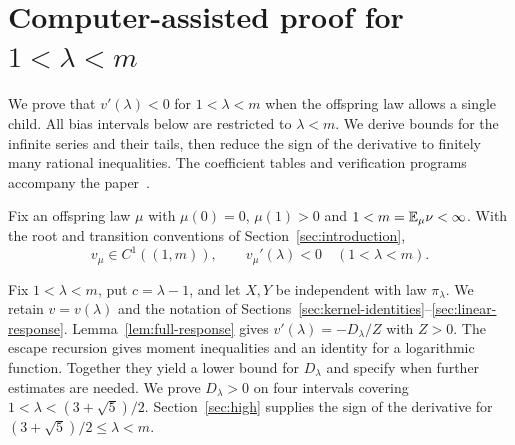 \section{Computer-assisted proof for \texorpdfstring{$1<\lambda<m$}{1 < lambda < m}}\label{sec:computer}

We prove that $v'(\lambda)<0$ for $1<\lambda<m$ when the offspring law allows a single child. All bias intervals below are restricted to $\lambda<m$. We derive bounds for the infinite series and their tails, then reduce the sign of the derivative to finitely many rational inequalities. The coefficient tables and verification programs accompany the paper~\cite{Supplement}.

\begin{theorem}\label{thm:computer}
Fix an offspring law $\mu$ with $\mu(0)=0$, $\mu(1)>0$ and $1<m=\mathbb E_\mu\nu<\infty$. With the root and transition conventions of Section~\ref{sec:introduction},
\begin{equation}\label{eq:computer-result}
 v_\mu\in C^1((1,m)),\qquad v_\mu'(\lambda)<0\quad(1<\lambda<m).
\end{equation}
\end{theorem}

Fix $1<\lambda<m$, put $c=\lambda-1$, and let $X,Y$ be independent with law $\pi_\lambda$. We retain $v=v(\lambda)$ and the notation of Sections~\ref{sec:kernel-identities}--\ref{sec:linear-response}. Lemma~\ref{lem:full-response} gives $v'(\lambda)=-D_\lambda/Z$ with $Z>0$. The escape recursion gives moment inequalities and an identity for a logarithmic function. Together they yield a lower bound for $D_\lambda$ and specify when further estimates are needed. We prove $D_\lambda>0$ on four intervals covering $1<\lambda<(3+\sqrt5)/2$. Section~\ref{sec:high} supplies the sign of the derivative for $(3+\sqrt5)/2\le\lambda<m$.








